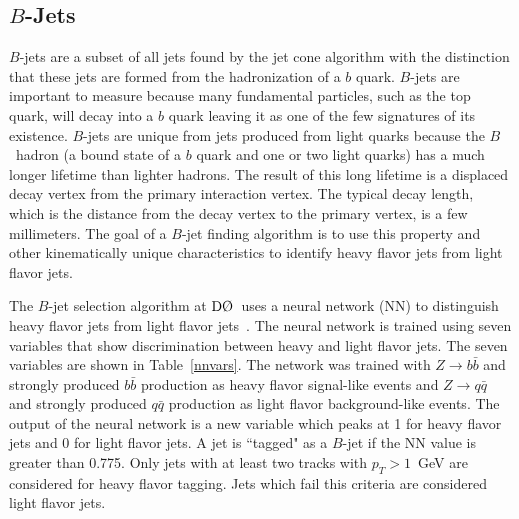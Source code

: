 \subsection{$B$-Jets}
\label{bidreco}

$B$-jets are a subset of all jets found by the jet cone algorithm with the distinction that these jets are formed from the hadronization of a $b$ quark. $B$-jets are important to measure because many fundamental particles, such as the top quark, will decay into a $b$ quark leaving it as one of the few signatures of its existence. $B$-jets are unique from jets produced from light quarks because the $B$~hadron (a bound state of a $b$ quark and one or two light quarks) has a much longer lifetime than lighter hadrons. The result of this long lifetime is a displaced decay vertex from the primary interaction vertex. The typical decay length, which is the distance from the decay vertex to the primary vertex, is a few millimeters. The goal of a $B$-jet finding algorithm is to use this property and other kinematically unique characteristics to identify heavy flavor jets from light flavor jets.

The $B$-jet selection algorithm at $\dzero$~uses a neural network (NN) to distinguish heavy flavor jets from light flavor jets~\cite{bid}. The neural network is trained using seven variables that show discrimination between heavy and light flavor jets. The seven variables are shown in Table~\ref{nnvars}.  The network was trained with $Z\rightarrow b\bar{b}$ and strongly produced $b\bar{b}$ production as heavy flavor signal-like events and $Z\rightarrow q\bar{q}$ and strongly produced $q\bar{q}$ production as light flavor background-like events. The output of the neural network is a new variable which peaks at 1 for heavy flavor jets and 0 for light flavor jets. A jet is ``tagged" as a $B$-jet if the NN value is greater than 0.775. Only jets with at least two tracks with $p_{T}>1$~GeV are considered for heavy flavor tagging. Jets which fail this criteria are considered light flavor jets.

